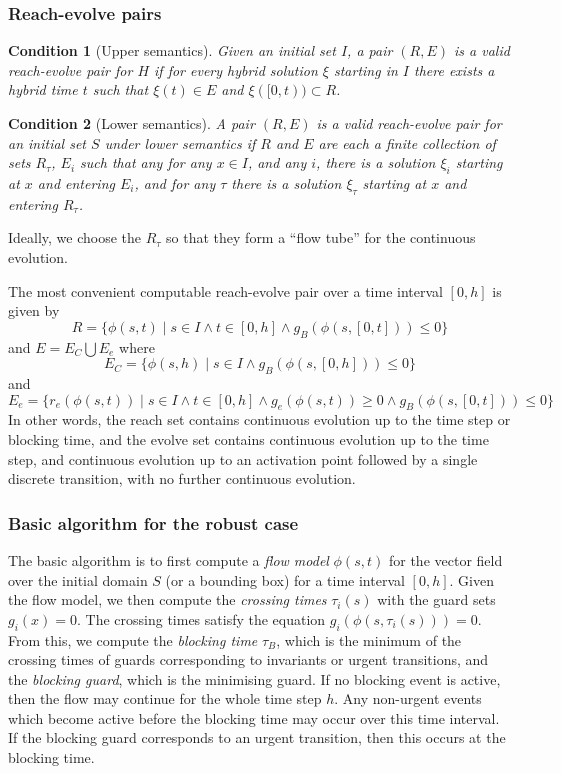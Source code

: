 \documentclass[english,a4paper]{article}
\theoremstyle{theorem}
\newtheorem*{condition*}{Condition}
\theoremstyle{definition}
\theoremstyle{remark}
\begin{document}
\subsubsection*{Reach-evolve pairs}

\begin{condition*}[Upper semantics]
Given an initial set $I$, a pair $(R,E)$ is a valid reach-evolve pair for $H$ if for every hybrid solution $\xi$ starting in $I$ there exists a hybrid time $t$ such that $\xi(t)\in E$ and $\xi([0,t))\subset R$.
\end{condition*}

\begin{condition*}[Lower semantics]
A pair $(R,E)$ is a valid reach-evolve pair for an initial set $S$ under \emph{lower semantics} if $R$ and $E$ are each a finite collection of sets $R_\tau$, $E_i$ such that any for any $x\in I$, and any $i$, there is a solution $\xi_i$ starting at $x$ and entering $E_i$, and for any $\tau$ there is a solution $\xi_\tau$ starting at $x$ and entering $R_\tau$.
\end{condition*}
Ideally, we choose the $R_\tau$ so that they form a ``flow tube'' for the continuous evolution.

The most convenient computable reach-evolve pair over a time interval $[0,h]$ is given by
\[ R=\{ \phi(s,t) \mid s\in I \wedge t\in[0,h] \wedge g_B(\phi(s,[0,t]))\leq 0\} \]
and $E=E_C \bigcup E_e$ where
\[ E_C=\{ \phi(s,h) \mid s\in I \wedge g_B(\phi(s,[0,h]))\leq 0\} \]
and
\[ E_e=\{ r_e(\phi(s,t)) \mid s\in I \wedge t\in[0,h] \wedge g_e(\phi(s,t))\geq 0 \wedge g_B(\phi(s,[0,t]))\leq 0 \} \]
In other words, the reach set contains continuous evolution up to the time step or blocking time, and the evolve set contains continuous evolution up to the time step, and continuous evolution up to an activation point followed by a single discrete transition, with no further continuous evolution.


\subsubsection*{Basic algorithm for the robust case}
The basic algorithm is to first compute a \emph{flow model} $\phi(s,t)$ for the vector field over the initial domain $S$ (or a bounding box) for a time interval $[0,h]$. Given the flow model, we then compute the \emph{crossing times} $\tau_i(s)$ with the guard sets $g_i(x)=0$. The crossing times satisfy the equation $g_i(\phi(s,\tau_i(s)))=0$. From this, we compute the \emph{blocking time} $\tau_B$, which is the minimum of the crossing times of guards corresponding to invariants or urgent transitions, and the \emph{blocking guard}, which is the minimising guard. If no blocking event is active, then the flow may continue for the whole time step $h$. Any non-urgent events which become active before the blocking time may occur over this time interval. If the blocking guard corresponds to an urgent transition, then this occurs at the blocking time.
\end{document}

